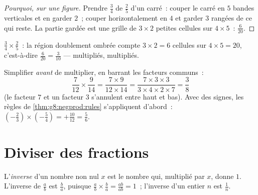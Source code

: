 \begin{proof}[Pourquoi, sur une figure]
Prendre $\frac34$ de $\frac25$ d'un carré~: couper le carré en $5$
bandes verticales et en garder $2$~; couper horizontalement en $4$ et
garder $3$ rangées de ce qui reste. La partie gardée est une grille
de $3 \times 2$ petites cellules sur $4 \times 5$~: 
$\frac{6}{20}$.
\end{proof}

\begin{omfigure}

{\small $\frac34 \times \frac25$~: la région doublement ombrée
compte $3 \times 2 = 6$ cellules sur $4 \times 5 = 20$, c'est-à-dire
$\frac{6}{20} = \frac{3}{10}$ ---  multipliés, 
multipliés.}
\end{omfigure}

\begin{example}\label{ex:g8:fractions:mult}
Simplifier \emph{avant} de multiplier, en barrant les facteurs
communs~:
\[
\frac{7}{12} \times \frac{9}{14}
= \frac{7 \times 9}{12 \times 14}
= \frac{7 \times 3 \times 3}{3 \times 4 \times 2 \times 7}
= \frac{3}{8}
\]
(le facteur $7$ et un facteur $3$ s'annulent entre haut et bas).
Avec des signes, les règles de \cref{thm:g8:negprod:rules}
s'appliquent d'abord~:
$\left(-\frac23\right) \times \left(-\frac{5}{4}\right) =
+\frac{10}{12} = \frac56$.
\end{example}

\section{Diviser des fractions}

\begin{definition}[Inverse]\label{def:g8:fractions:inverse}
L'\emph{inverse} d'un nombre non nul $x$ est le
nombre qui, multiplié par $x$, donne $1$. L'inverse de $\frac ab$ est
$\frac ba$, puisque $\frac ab \times \frac ba = \frac{ab}{ab} = 1$~;
l'inverse d'un entier $n$ est $\frac1n$.
\end{definition}

